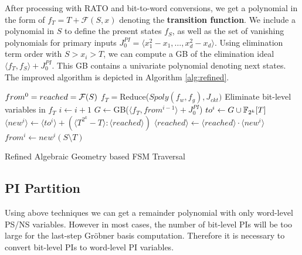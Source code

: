 After processing with RATO and bit-to-word conversions, we get a polynomial in the 
form of $f_T = T+\mathcal{F}(S,x)$
denoting the {\bf transition function}. We include a polynomial in $S$ to define the present states $f_S$,
as well as the set of vanishing polynomials for primary inputs 
$J_0^{PI} = \langle x_1^2-x_1,\dots,x_d^2-x_d\rangle$. Using elimination term order with $S>x_i>T$,
we can compute a GB of the elimination ideal $\langle f_T,f_S\rangle + J_0^{PI}$. This GB contains a univariate
polynomial denoting next states. The improved algorithm is depicted in Algorithm \ref{alg:refined}.

\IncMargin{1em}
\begin{algorithm}[hbt]
\SetAlgoNoLine
\Indm
\Indp

  $from^0 = reached = {\mathcal{F}}(S)$\;
  $f_T = $Reduce($Spoly(f_w,f_g), J_{ckt})$\;
	Eliminate bit-level variables in $f_T$\;
  {
  	$i \gets i + 1$\;
  	$G \gets$GB($\langle f_T , from^{i-1}\rangle+J_0^{PI}$)\;
	$to^i \gets G\cup {\mathbb{F}}_{2^k}[T]$\;
	$\langle new^i\rangle \gets \langle to^i\rangle + (\langle T^{2^k}-T\rangle:\langle reached\rangle)$\;
  	$\langle reached\rangle \gets \langle reached\rangle \cdot \langle new^i\rangle$\;
	$from^i \gets new^i(S\setminus T)$\;
  }
\caption {Refined Algebraic Geometry based FSM Traversal}\label{alg:refined}
\end{algorithm}
\DecMargin{1em}

\subsection{PI Partition}
Using above techniques we can get a remainder polynomial with only word-level PS/NS variables. However in most 
cases, the number of bit-level PIs will be too large for the last-step Gr\"obner basis computation. 
Therefore it is necessary to convert bit-level PIs to word-level PI variables. 

